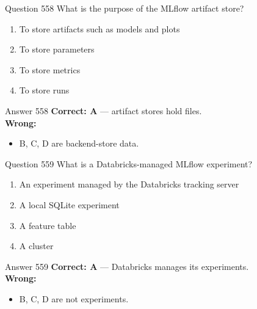 \documentclass[aspectratio=169,11pt]{beamer}
\begin{document}
	\begin{frame}{Question 558}
		What is the purpose of the MLflow artifact store?
		\begin{enumerate}[label=\Alph*.]
			\item To store artifacts such as models and plots
			\item To store parameters
			\item To store metrics
			\item To store runs
		\end{enumerate}
	\end{frame}
	\begin{frame}{Answer 558}
		\textbf{Correct: A} --- artifact stores hold files.\\
		\vspace{0.5em}
		\textbf{Wrong:}
		\begin{itemize}
			\item B, C, D are backend-store data.
		\end{itemize}
	\end{frame}
	
	\begin{frame}{Question 559}
		What is a Databricks-managed MLflow experiment?
		\begin{enumerate}[label=\Alph*.]
			\item An experiment managed by the Databricks tracking server
			\item A local SQLite experiment
			\item A feature table
			\item A cluster
		\end{enumerate}
	\end{frame}
	\begin{frame}{Answer 559}
		\textbf{Correct: A} --- Databricks manages its experiments.\\
		\vspace{0.5em}
		\textbf{Wrong:}
		\begin{itemize}
			\item B, C, D are not experiments.
		\end{itemize}
	\end{frame}
	
\end{document}
